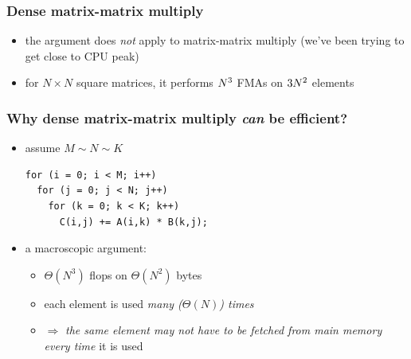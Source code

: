 \documentclass[12pt,dvipdfmx]{beamer}
\newcommand{\ao}[1]{{\color{blue}#1}}
\newcommand{\aka}[1]{{\color{red}#1}}
\begin{document}
\begin{frame}
\frametitle{Dense matrix\ao{-matrix} multiply}
\begin{itemize}
\item<1-> the argument does \ao{\em not} apply to matrix-matrix
  multiply (we've been trying to get close to CPU peak)
  \begin{center}
  \def\svgwidth{0.5\textwidth}
  {\scriptsize }
  \end{center}
  
\item<2-> for $N\times N$ square matrices,
  it performs $\ao{N^3}$ FMAs on $3 \ao{N^2}$ elements


\end{itemize}
\end{frame}

\begin{frame}[fragile]
  \frametitle{Why dense matrix\ao{-matrix} multiply {\it can} be efficient?}
  \begin{itemize}
  \item assume $M \sim N \sim K$
\begin{lstlisting}
for (i = 0; i < M; i++)  
  for (j = 0; j < N; j++)  
    for (k = 0; k < K; k++)  
      C(i,j) += A(i,k) * B(k,j);
\end{lstlisting}

\item a macroscopic argument:
  \begin{itemize}
  \item $\Theta(N^3)$ flops on $\Theta(N^2)$ bytes
    \item each element is used {\it many ($\Theta(N)$) times}
    \item $\Rightarrow$ \ao{\it the same element may not have to be fetched
        from main memory every time} it is used
   \end{itemize}
\end{itemize}

\end{frame}
\end{document}
